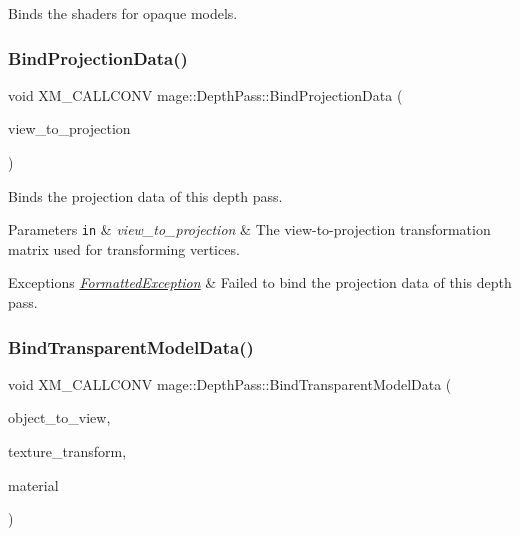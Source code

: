 Binds the shaders for opaque models. \hypertarget{classmage_1_1_depth_pass_a9fa93bf5d67b9396d358e595be55a075}{}\label{classmage_1_1_depth_pass_a9fa93bf5d67b9396d358e595be55a075} 
\subsubsection{\texorpdfstring{Bind\+Projection\+Data()}{BindProjectionData()}}
{\footnotesize\ttfamily void X\+M\+\_\+\+C\+A\+L\+L\+C\+O\+NV mage\+::\+Depth\+Pass\+::\+Bind\+Projection\+Data (\begin{DoxyParamCaption}\item[{F\+X\+M\+M\+A\+T\+R\+IX}]{view\+\_\+to\+\_\+projection }\end{DoxyParamCaption})\hspace{0.3cm}{\ttfamily [private]}}

Binds the projection data of this depth pass.


\begin{DoxyParams}[1]{Parameters}
\mbox{\tt in}  & {\em view\+\_\+to\+\_\+projection} & The view-\/to-\/projection transformation matrix used for transforming vertices. \\
\hline
\end{DoxyParams}

\begin{DoxyExceptions}{Exceptions}
{\em \hyperlink{structmage_1_1_formatted_exception}{Formatted\+Exception}} & Failed to bind the projection data of this depth pass. \\
\hline
\end{DoxyExceptions}
\hypertarget{classmage_1_1_depth_pass_a37236eb83793b4f11f1f4f2ed86f60e2}{}\label{classmage_1_1_depth_pass_a37236eb83793b4f11f1f4f2ed86f60e2} 
\subsubsection{\texorpdfstring{Bind\+Transparent\+Model\+Data()}{BindTransparentModelData()}}
{\footnotesize\ttfamily void X\+M\+\_\+\+C\+A\+L\+L\+C\+O\+NV mage\+::\+Depth\+Pass\+::\+Bind\+Transparent\+Model\+Data (\begin{DoxyParamCaption}\item[{F\+X\+M\+M\+A\+T\+R\+IX}]{object\+\_\+to\+\_\+view,  }\item[{C\+X\+M\+M\+A\+T\+R\+IX}]{texture\+\_\+transform,  }\item[{const \hyperlink{structmage_1_1_material}{Material} $\ast$}]{material }\end{DoxyParamCaption})\hspace{0.3cm}{\ttfamily [private]}}

